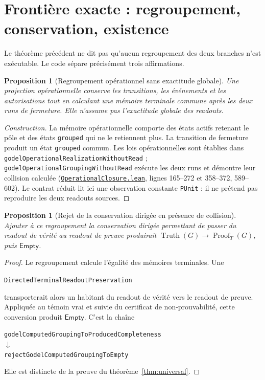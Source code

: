 \documentclass[11pt,a4paper]{article}
\newcommand{\Truth}{\operatorname{Truth}}
\newcommand{\Proof}{\operatorname{Proof}}
\newcommand{\Empty}{\mathsf{Empty}}
\newcommand{\code}[1]{\nolinkurl{#1}}
\newcommand{\SourceAt}[3]{\href{https://github.com/JohnDoe-collab-stack/relational-perimeter/blob/1e5aeda745559d62a3819bb3213da7fce3c31ad1/#1\#L#2}{\nolinkurl{#3}}}
\newtheorem{proposition}[theoreme]{Proposition}
\theoremstyle{remark}
\begin{document}
\section{Frontière exacte : regroupement, conservation, existence}
\label{sec:frontier}

Le théorème précédent ne dit pas qu'aucun regroupement des deux branches
n'est exécutable. Le code sépare précisément trois affirmations.

\begin{proposition}[Regroupement opérationnel sans exactitude globale]
Une projection opérationnelle conserve les transitions, les événements
et les autorisations tout en calculant une mémoire terminale commune après
les deux runs de fermeture. Elle n'assume pas l'exactitude globale des
readouts.
\end{proposition}
\begin{proof}[Construction]
La mémoire opérationnelle comporte des états actifs retenant le pôle et
des états \code{grouped} qui ne le retiennent plus. La transition de
fermeture produit un état \code{grouped} commun. Les lois opérationnelles
sont établies dans \code{godelOperationalRealizationWithoutRead} ;
\code{godelOperationalGroupingWithoutRead} exécute les deux runs et
démontre leur collision calculée (\SourceAt{RelationalPerimeter/Constitution/Godel/OperationalClosure.lean}{589-L602}{OperationalClosure.lean},
lignes 165--272 et 358--372, 589--602). Le contrat réduit lit ici une
observation constante \code{PUnit} : il ne prétend pas reproduire les deux
readouts sources.
\end{proof}

\begin{proposition}[Rejet de la conservation dirigée en présence de collision]
Ajouter à ce regroupement la conservation dirigée permettant de passer du
readout de vérité au readout de preuve produirait
$\Truth(G)\to\Proof_T(G)$, puis $\Empty$.
\end{proposition}
\begin{proof}
Le regroupement calcule l'égalité des mémoires terminales. Une
\begin{center}
\code{DirectedTerminalReadoutPreservation}
\end{center}
transporterait alors un
habitant du readout de vérité vers le readout de preuve. Appliquée au
témoin vrai et suivie du certificat de non-prouvabilité, cette conversion
produit $\Empty$. C'est la chaîne
\begin{center}
\code{godelComputedGroupingToProducedCompleteness}\\[2pt]
$\downarrow$\\[2pt]
\code{rejectGodelComputedGroupingToEmpty}
\end{center}
Elle est distincte de la
preuve du théorème~\ref{thm:universal}.
\end{proof}
\end{document}
